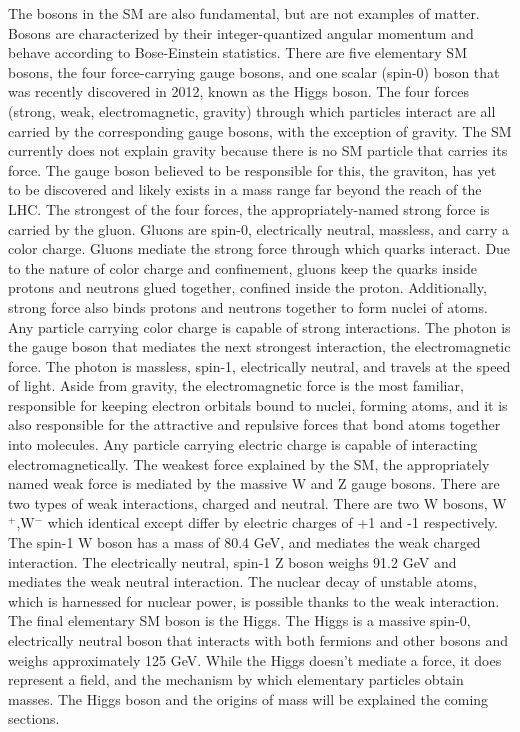 The bosons in the SM are also fundamental, but are not examples of matter. Bosons are characterized by their integer-quantized angular momentum and behave according to Bose-Einstein statistics. There are five elementary SM bosons, the four force-carrying gauge
bosons, and one scalar (spin-0) boson that was recently discovered in 2012, known as the Higgs boson. The four forces (strong, weak, electromagnetic, gravity) through which particles interact are all carried by the corresponding gauge bosons, with the exception
of gravity. The SM currently does not explain gravity because there is no SM particle that carries its force. The gauge boson believed to be responsible for this, the graviton, has yet to be discovered and likely exists in a mass range far beyond the reach of
the LHC. The strongest of the four forces, the appropriately-named strong force is carried by the gluon. Gluons are spin-0, electrically neutral, massless, and carry a color charge. Gluons mediate the strong force through which quarks interact. Due to the nature of
color charge and confinement, gluons keep the quarks inside protons and neutrons glued together, confined inside the proton. Additionally, strong force also binds protons and neutrons together to form nuclei of atoms. Any particle carrying color charge is capable
of strong interactions. 
The photon is the gauge boson that mediates the next strongest interaction, the electromagnetic force. The photon is massless, spin-1, electrically neutral, and travels at the speed of light. Aside from gravity, the electromagnetic force is the most familiar,
responsible for keeping electron orbitals bound to nuclei, forming atoms, and it is also responsible for the attractive and repulsive forces that bond atoms together into molecules. Any particle carrying electric charge is capable of interacting electromagnetically.
The weakest force explained by the SM, the appropriately named weak force is mediated by the massive W and Z gauge bosons. There are two types of weak interactions, charged and neutral.
There are two W bosons, W$^+$,W$^-$ which identical except differ by electric charges of +1 and -1 respectively. The spin-1 W boson has a mass of 80.4 GeV, and mediates the weak charged interaction.
The electrically neutral, spin-1 Z boson weighs 91.2 GeV and mediates the weak neutral interaction. The nuclear decay of unstable atoms, which is harnessed for nuclear power, is possible thanks to the weak interaction.
The final elementary SM boson is the Higgs. The Higgs is a massive spin-0, electrically neutral boson that interacts with both fermions and other bosons and weighs approximately 125 GeV. While the Higgs doesn't mediate a force, it does represent a field, and the
mechanism by which elementary particles obtain masses. The Higgs boson and the origins of mass will be explained the coming sections. 


